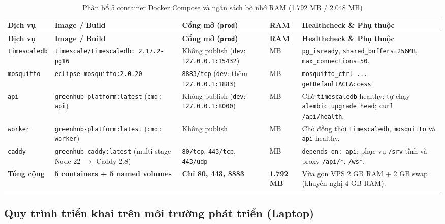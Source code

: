 \begingroup
\scriptsize
\sloppy
\setlength{\tabcolsep}{3pt}
\renewcommand{\arraystretch}{1.12}
\begin{longtable}{|>{\raggedright\arraybackslash}p{}|>{\raggedright\arraybackslash}p{}|>{\raggedright\arraybackslash}p{}|>{\raggedleft\arraybackslash}p{}|>{\raggedright\arraybackslash}p{}|}
\caption{Phân bổ 5 container Docker Compose và ngân sách bộ nhớ RAM (1.792 MB / 2.048 MB)}\label{tab:docker-budget}\\
\hline
\textbf{Dịch vụ} & \textbf{Image / Build} & \textbf{Cổng mở (\texttt{prod})} & \textbf{RAM} & \textbf{Healthcheck \& Phụ thuộc} \\
\hline
\endfirsthead
\hline
\textbf{Dịch vụ} & \textbf{Image / Build} & \textbf{Cổng mở (\texttt{prod})} & \textbf{RAM} & \textbf{Healthcheck \& Phụ thuộc} \\
\hline
\endhead
\texttt{timescaledb} & \texttt{timescale/timescaledb: 2.17.2-pg16} & Không publish (\texttt{dev}: \texttt{127.0.0.1:15432}) & 640 MB & \texttt{pg\_isready}, \texttt{shared\_buffers=256MB}, \texttt{max\_connections=50}. \\ \hline
\texttt{mosquitto} & \texttt{eclipse-mosquitto:2.0.20} & \texttt{8883/tcp} (\texttt{dev}: thêm \texttt{127.0.0.1:1883}) & 128 MB & \texttt{mosquitto\_ctrl ... getDefaultACLAccess}. \\ \hline
\texttt{api} & \texttt{greenhub-platform:latest} (\texttt{cmd: api}) & Không publish (\texttt{dev}: \texttt{127.0.0.1:8000}) & 384 MB & Chờ \texttt{timescaledb} healthy; tự chạy \texttt{alembic upgrade head}; \texttt{curl /api/health}. \\ \hline
\texttt{worker} & \texttt{greenhub-platform:latest} (\texttt{cmd: worker}) & Không publish & 512 MB & Chờ đồng thời \texttt{timescaledb}, \texttt{mosquitto} và \texttt{api} healthy. \\ \hline
\texttt{caddy} & \texttt{greenhub-caddy:latest} (multi-stage Node 22 \(\rightarrow\) Caddy 2.8) & \texttt{80/tcp}, \texttt{443/tcp}, \texttt{443/udp} & 128 MB & \texttt{depends\_on: api}; phục vụ \texttt{/srv} tĩnh và proxy \texttt{/api/*}, \texttt{/ws*}. \\ \hline
\textbf{Tổng cộng} & \textbf{5 containers + 5 named volumes} & \textbf{Chỉ 80, 443, 8883} & \textbf{1.792 MB} & Vừa gọn VPS 2 GB RAM + 2 GB swap (khuyến nghị 4 GB RAM). \\ \hline
\end{longtable}
\endgroup

\subsection{Quy trình triển khai trên môi trường phát triển (Laptop)}
\label{subsec:c4-dev-deploy}


